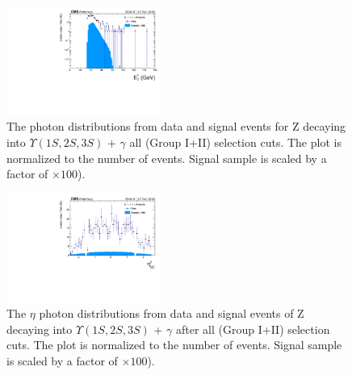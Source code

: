 \begin{figure}[!htbp]
\begin{center}
\includegraphics[width=0.45\textwidth]{figures_and_tables/outputPlots/ZtoUpsilon_Cat0_ZZZZZ/nEvts/data_x_mc/withKinCuts/h_withKin_Photon_pt}\hspace*{1.cm}
\end{center}\vspace*{-.5cm}
\caption{The \PT photon distributions from data and signal events for Z decaying into $\Upsilon(1S,2S,3S)$ + $\gamma$ all (Group I+II) selection cuts. The plot is normalized to the number of events. Signal sample is scaled by a factor of $\times 100$).}
\label{fig:pTPhoton_ZtoUpsilon_Cat0_groupI_plus_II}
\end{figure}


\begin{figure}[!htbp]
\begin{center}
\includegraphics[width=0.45\textwidth]{figures_and_tables/outputPlots/ZtoUpsilon_Cat0_ZZZZZ/nEvts/data_x_mc/withKinCuts/h_withKin_Photon_eta}\hspace*{1.cm}
\end{center}\vspace*{-.5cm}
\caption{The $\eta$ photon distributions from data and signal events of Z decaying into $\Upsilon(1S,2S,3S)$ + $\gamma$ after all (Group I+II) selection cuts. The plot is normalized to the number of events. Signal sample is scaled by a factor of $\times 100$).}
\label{fig:etaPhoton_ZtoUpsilon_Cat0_groupI_plus_II}
\end{figure}

